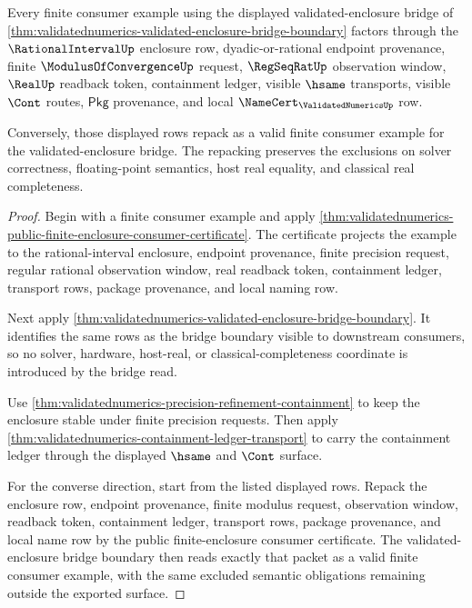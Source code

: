 \begin{theorem}
\label{thm:validatednumerics-finite-consumer-example-completeness}
Every finite consumer example using the displayed validated-enclosure bridge
of \autoref{thm:validatednumerics-validated-enclosure-bridge-boundary}
factors through the $\RationalIntervalUp$ enclosure row, dyadic-or-rational
endpoint provenance, finite $\ModulusOfConvergenceUp$ request,
$\RegSeqRatUp$ observation window, $\RealUp$ readback token, containment
ledger, visible $\hsame$ transports, visible $\Cont$ routes, $\mathsf{Pkg}$
provenance, and local $\NameCert_{\ValidatedNumericsUp}$ row.

Conversely, those displayed rows repack as a valid finite consumer example for
the validated-enclosure bridge. The repacking preserves the exclusions on
solver correctness, floating-point semantics, host real equality, and
classical real completeness.
\end{theorem}
\begin{proof}
Begin with a finite consumer example and apply
\autoref{thm:validatednumerics-public-finite-enclosure-consumer-certificate}.
The certificate projects the example to the rational-interval enclosure,
endpoint provenance, finite precision request, regular rational observation
window, real readback token, containment ledger, transport rows, package
provenance, and local naming row.

Next apply
\autoref{thm:validatednumerics-validated-enclosure-bridge-boundary}. It
identifies the same rows as the bridge boundary visible to downstream
consumers, so no solver, hardware, host-real, or classical-completeness
coordinate is introduced by the bridge read.

Use \autoref{thm:validatednumerics-precision-refinement-containment} to keep
the enclosure stable under finite precision requests. Then apply
\autoref{thm:validatednumerics-containment-ledger-transport} to carry the
containment ledger through the displayed $\hsame$ and $\Cont$ surface.

For the converse direction, start from the listed displayed rows. Repack the
enclosure row, endpoint provenance, finite modulus request, observation
window, readback token, containment ledger, transport rows, package provenance,
and local name row by the public finite-enclosure consumer certificate. The
validated-enclosure bridge boundary then reads exactly that packet as a valid
finite consumer example, with the same excluded semantic obligations remaining
outside the exported surface.
\end{proof}

